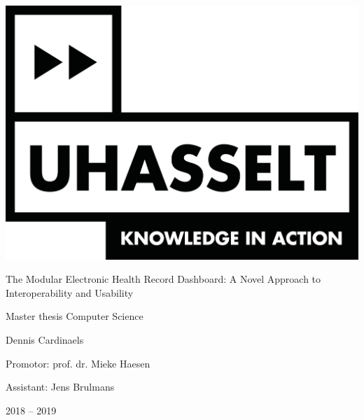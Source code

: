 
\begin{titlepage}
    \centering
    
    
    \includegraphics[scale=0.5]{chapters/title_page/logo_uhasselt}		
    \vspace{1cm}
    
    \Huge The Modular Electronic Health Record Dashboard: A Novel Approach to Interoperability and Usability
    \vspace{0.4cm}
    
    \large Master thesis Computer Science
    \vspace{1cm}
    
    \LARGE Dennis Cardinaels
    \vspace{1cm}
    
    \large Promotor: prof. dr. Mieke Haesen
    \vspace{0.2cm}
    
    Assistant: Jens Brulmans
    
    \vspace{1.2cm}
    
    
    \Large 2018 -- 2019 %
    
\end{titlepage}